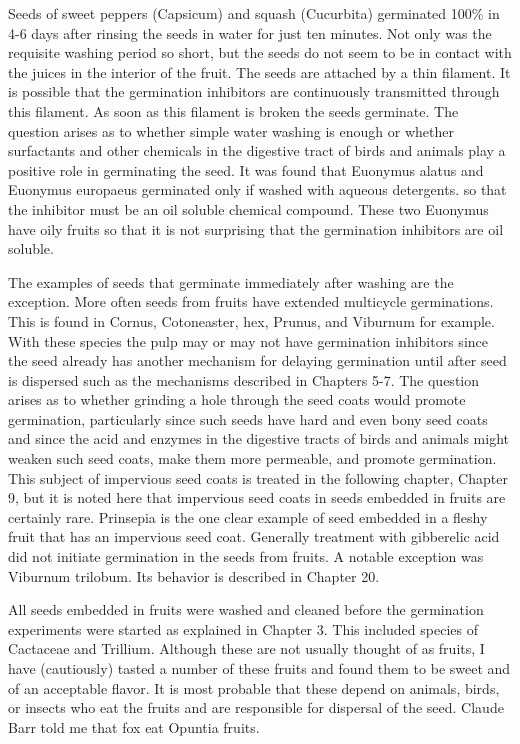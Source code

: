 Seeds of sweet peppers (Capsicum) and squash (Cucurbita) germinated 100\%
in 4-6 days after rinsing the seeds in water for just ten minutes. Not only was the
requisite washing period so short, but the seeds do not seem to be in contact with the
juices in the interior of the fruit. The seeds are attached by a thin filament. It is
possible that the germination inhibitors are continuously transmitted through this
filament. As soon as this filament is broken the seeds germinate.
The question arises as to whether simple water washing is enough or whether
surfactants and other chemicals in the digestive tract of birds and animals play a
positive role in germinating the seed. It was found that Euonymus alatus and
Euonymus europaeus germinated only if washed with aqueous detergents. so that the
inhibitor must be an oil soluble chemical compound. These two Euonymus have oily
fruits so that it is not surprising that the germination inhibitors are oil soluble.

The examples of seeds that germinate immediately after washing are the
exception. More often seeds from fruits have extended multicycle germinations. This
is found in Cornus, Cotoneaster, hex, Prunus, and Viburnum for example. With these
species the pulp may or may not have germination inhibitors since the seed already
has another mechanism for delaying germination until after seed is dispersed such as
the mechanisms described in Chapters 5-7. The question arises as to whether
grinding a hole through the seed coats would promote germination, particularly since
such seeds have hard and even bony seed coats and since the acid and enzymes in
the digestive tracts of birds and animals might weaken such seed coats, make them
more permeable, and promote germination. This subject of impervious seed coats is
treated in the following chapter, Chapter 9, but it is noted here that impervious seed
coats in seeds embedded in fruits are certainly rare. Prinsepia is the one clear
example of seed embedded in a fleshy fruit that has an impervious seed coat.
Generally treatment with gibberelic acid did not initiate germination in the seeds
from fruits. A notable exception was Viburnum trilobum. Its behavior is described in
Chapter 20.

All seeds embedded in fruits were washed and cleaned before the germination
experiments were started as explained in Chapter 3. This included species of
Cactaceae and Trillium. Although these are not usually thought of as fruits, I have
(cautiously) tasted a number of these fruits and found them to be sweet and of an
acceptable flavor. It is most probable that these depend on animals, birds, or insects
who eat the fruits and are responsible for dispersal of the seed. Claude Barr told me
that fox eat Opuntia fruits.

